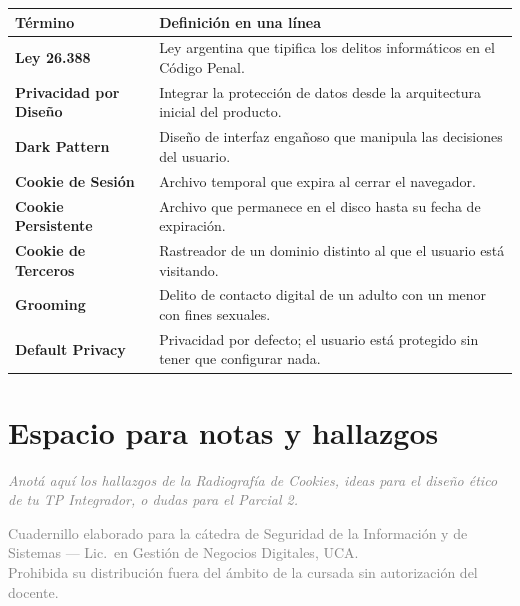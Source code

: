\documentclass[12pt,a4paper]{article}
\renewcommand{\arraystretch}{1.25}
\begin{document}
\renewcommand{\arraystretch}{1.4}
\begin{tabularx}{\textwidth}{>{\bfseries}p{4.5cm}X}
\toprule
\textbf{T\'ermino} & \textbf{Definici\'on en una l\'inea} \\
\midrule
Ley 26.388 & Ley argentina que tipifica los delitos inform\'aticos en el C\'odigo Penal. \\
Privacidad por Dise\~no & Integrar la protecci\'on de datos desde la arquitectura inicial del producto. \\
Dark Pattern & Dise\~no de interfaz enga\~noso que manipula las decisiones del usuario. \\
Cookie de Sesi\'on & Archivo temporal que expira al cerrar el navegador. \\
Cookie Persistente & Archivo que permanece en el disco hasta su fecha de expiraci\'on. \\
Cookie de Terceros & Rastreador de un dominio distinto al que el usuario est\'a visitando. \\
Grooming & Delito de contacto digital de un adulto con un menor con fines sexuales. \\
Default Privacy & Privacidad por defecto; el usuario est\'a protegido sin tener que configurar nada. \\
\bottomrule
\end{tabularx}

\vspace{1cm}

\section{Espacio para notas y hallazgos}

\begin{tcolorbox}[colback=grisClaro, colframe=gray!50, arc=2mm, height=7cm]
\textcolor{gray}{\itshape Anot\'a aqu\'i los hallazgos de la Radiograf\'ia de Cookies, ideas para el dise\~no \'etico de tu TP Integrador, o dudas para el Parcial 2.}
\end{tcolorbox}

\vfill
\begin{center}
\small\textcolor{gray}{%
Cuadernillo elaborado para la c\'atedra de Seguridad de la Informaci\'on y de
Sistemas --- Lic.\ en Gesti\'on de Negocios Digitales, UCA.\\
Prohibida su distribuci\'on fuera del \'ambito de la cursada sin autorizaci\'on del docente.}
\end{center}
\end{document}
